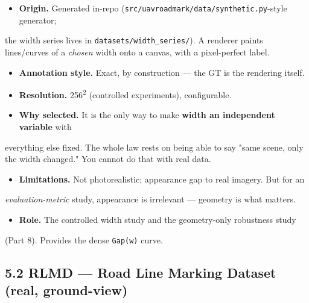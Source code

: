 \documentclass[11pt]{article}
\begin{document}
\begin{itemize}\setlength{\itemsep}{1pt}
\item \textbf{Origin.} Generated in-repo (\texttt{src/uavroadmark/data/synthetic.py}-style generator;
\end{itemize}
  the width series lives in \texttt{datasets/width\_series/}). A renderer paints lines/curves   of a \textit{chosen} width onto a canvas, with a pixel-perfect label.
\begin{itemize}\setlength{\itemsep}{1pt}
\item \textbf{Annotation style.} Exact, by construction --- the GT is the rendering itself.
\item \textbf{Resolution.} 256\textsuperscript{2} (controlled experiments), configurable.
\item \textbf{Why selected.} It is the only way to make \textbf{width an independent variable} with
\end{itemize}
  everything else fixed. The whole law rests on being able to say "same scene, only   the width changed." You cannot do that with real data.
\begin{itemize}\setlength{\itemsep}{1pt}
\item \textbf{Limitations.} Not photorealistic; appearance gap to real imagery. But for an
\end{itemize}
  \textit{evaluation-metric} study, appearance is irrelevant --- geometry is what matters.
\begin{itemize}\setlength{\itemsep}{1pt}
\item \textbf{Role.} The controlled width study and the geometry-only robustness study
\end{itemize}
  (Part 8). Provides the dense \texttt{Gap(w)} curve.

\subsection*{5.2 RLMD --- Road Line Marking Dataset (real, ground-view)}
\end{document}
